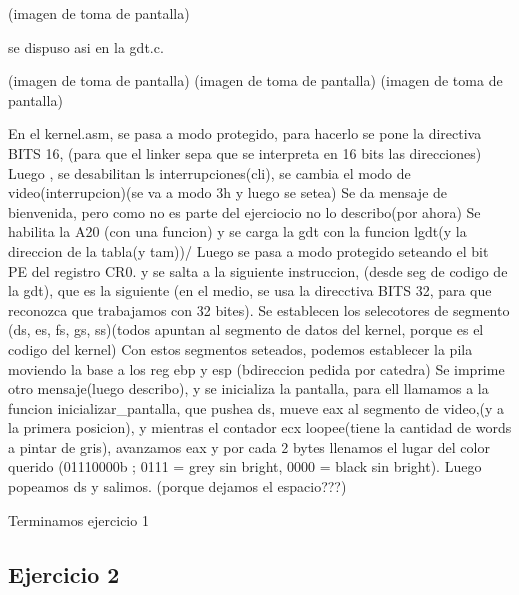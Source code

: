 \documentclass[a4paper]{article}
\begin{document}
(imagen de toma de pantalla)

se dispuso asi en la gdt.c.


(imagen de toma de pantalla)
(imagen de toma de pantalla)
(imagen de toma de pantalla)

En el kernel.asm, se pasa a modo protegido, para hacerlo se pone la directiva BITS 16, (para que el linker sepa que se interpreta en 16 bits las direcciones)
Luego , se desabilitan ls interrupciones(cli), se cambia el modo de video(interrupcion)(se va a modo 3h y luego   se setea) 
Se da mensaje de bienvenida, pero como no es parte del ejerciocio no lo describo(por ahora)
Se habilita la A20 (con una funcion) y se carga la gdt con la funcion lgdt(y la direccion de la tabla(y tam))/
Luego se pasa a modo protegido seteando el bit PE del registro CR0. y se salta a la siguiente instruccion, (desde seg de codigo de la gdt), que es la siguiente (en el medio, se usa la direcctiva BITS 32, para que reconozca que trabajamos con 32 bites). Se establecen los selecotores de segmento (ds, es, fs, gs, ss)(todos apuntan al segmento de datos del kernel, porque es el codigo del kernel)
Con estos segmentos seteados, podemos establecer la pila moviendo la base a los reg ebp y esp (bdireccion pedida por catedra)
Se imprime otro mensaje(luego describo), y se inicializa la pantalla, para ell llamamos a la funcion inicializar_pantalla, que pushea ds, mueve eax al segmento de video,(y a la primera posicion), y mientras el contador ecx loopee(tiene la cantidad de words a pintar de gris), avanzamos eax y por cada 2 bytes llenamos el lugar del color querido (01110000b ; 0111 = grey sin bright, 0000 = black sin bright). Luego popeamos ds y salimos. (porque dejamos el espacio???)
   
Terminamos ejercicio 1

\subsection{Ejercicio 2}
\end{document}
